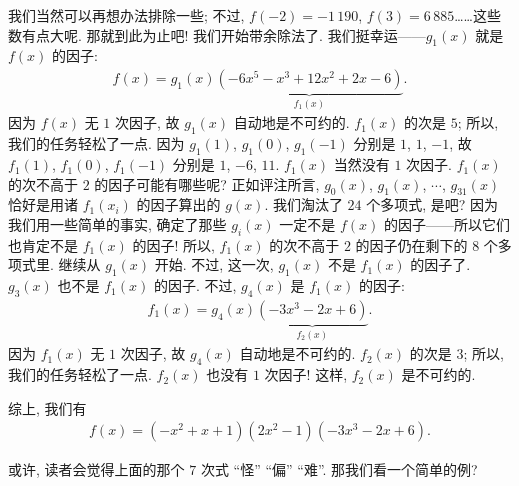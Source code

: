 \begin{example}
    我们当然可以再想办法排除一些; 不过, $f(-2) = -1\,190$, $f(3) = 6\,885$……这些数有点大呢. 那就到此为止吧! 我们开始带余除法了. 我们挺幸运——$g_1 (x)$ 就是 $f(x)$ 的因子:
    \begin{align*}
        f(x) = g_1 (x) \underbrace{(-6 x^5-x^3+12 x^2+2 x-6)}_{f_1 (x)}.
    \end{align*}
    因为 $f(x)$ 无 $1$ 次因子, 故 $g_1 (x)$ 自动地是不可约的. $f_1 (x)$ 的次是 $5$; 所以, 我们的任务轻松了一点. 因为 $g_1 (1)$, $g_1 (0)$, $g_1 (-1)$ 分别是 $1$, $1$, $-1$, 故 $f_1 (1)$, $f_1 (0)$, $f_1 (-1)$ 分别是 $1$, $-6$, $11$. $f_1 (x)$ 当然没有 $1$ 次因子. $f_1 (x)$ 的次不高于 $2$ 的因子可能有哪些呢? 正如评注所言, $g_0 (x)$, $g_1 (x)$, $\cdots$, $g_{31} (x)$ 恰好是用诸 $f_1 (x_i)$ 的因子算出的 $g(x)$. 我们淘汰了 $24$ 个多项式, 是吧? 因为我们用一些简单的事实, 确定了那些 $g_i (x)$ 一定不是 $f(x)$ 的因子——所以它们也肯定不是 $f_1 (x)$ 的因子! 所以, $f_1 (x)$ 的次不高于 $2$ 的因子仍在剩下的 $8$ 个多项式里. 继续从 $g_1 (x)$ 开始. 不过, 这一次, $g_1 (x)$ 不是 $f_1 (x)$ 的因子了. $g_3 (x)$ 也不是 $f_1 (x)$ 的因子. 不过, $g_4 (x)$ 是 $f_1 (x)$ 的因子:
    \begin{align*}
        f_1 (x) = g_4 (x) \underbrace{(-3 x^3-2 x+6)}_{f_2 (x)}.
    \end{align*}
    因为 $f_1 (x)$ 无 $1$ 次因子, 故 $g_4 (x)$ 自动地是不可约的. $f_2 (x)$ 的次是 $3$; 所以, 我们的任务轻松了一点. $f_2 (x)$ 也没有 $1$ 次因子! 这样, $f_2 (x)$ 是不可约的.

    综上, 我们有
    \begin{align*}
        f(x) = (-x^2+x+1) (2x^2-1) (-3x^3-2x+6).
    \end{align*}
\end{example}

或许, 读者会觉得上面的那个 $7$ 次式 ``怪'' ``偏'' ``难''. 那我们看一个简单的例?

